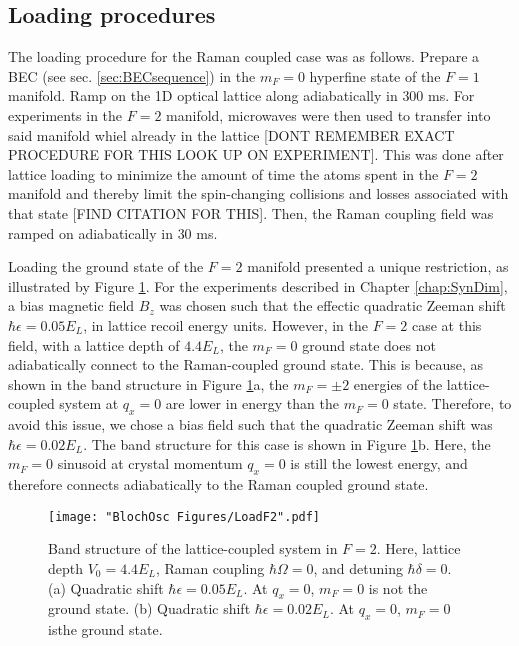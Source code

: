 \subsection{Loading procedures}
The loading procedure for the Raman coupled case was  as follows. Prepare a \Rb{} BEC (see sec. \ref{sec:BECsequence}) in the $m_F=0$ hyperfine state of the $F=1$ manifold. Ramp on the 1D optical lattice along \ex{} adiabatically in $300$ ms. For experiments in the $F=2$ manifold, microwaves were then used to transfer into said manifold whiel already in the lattice [DONT REMEMBER EXACT PROCEDURE FOR THIS LOOK UP ON EXPERIMENT]. This was done after lattice loading to minimize the amount of time the atoms spent in the $F=2$ manifold and thereby limit the spin-changing collisions and losses associated with that state [FIND CITATION FOR THIS].   Then, the Raman coupling field was ramped on adiabatically in $30$ ms.

Loading the ground state of the $F=2$ manifold presented a unique restriction, as illustrated by Figure \ref{fig:LoadF2}. For the experiments described in Chapter \ref{chap:SynDim}, a bias magnetic field $B_z$ was chosen such that the effectic quadratic Zeeman shift $\hbar\epsilon = 0.05 E_L$, in lattice recoil energy units. However, in the $F=2$ case at this field, with a lattice depth of $4.4 E_L$, the $m_F=0$ ground state does not adiabatically connect to the Raman-coupled ground state. This is because, as shown in the band structure in Figure \ref{fig:LoadF2}a, the $m_F=\pm2$ energies of the lattice-coupled system at $q_x=0$ are lower in energy than the $m_F=0$ state. Therefore, to avoid this issue, we chose a bias field such that the quadratic Zeeman shift was $\hbar\epsilon = 0.02 E_L$. The band structure for this case is shown in Figure \ref{fig:LoadF2}b. Here, the $m_F=0$ sinusoid at crystal momentum $q_x=0$ is still the lowest energy, and therefore connects adiabatically to the Raman coupled ground state. 
\begin{figure}
\texttt{[image: "BlochOsc Figures/LoadF2".pdf]}
\caption{Band structure of the lattice-coupled system in $F=2$. Here, lattice depth $V_0=4.4 E_L$, Raman coupling $\hbar\Omega=0$, and detuning $\hbar\delta=0$. (a) Quadratic shift $\hbar\epsilon=0.05 E_L$. At $q_x=0$, $m_F=0$ is not the ground state. (b) Quadratic shift $\hbar\epsilon = 0.02 E_L$.  At $q_x=0$, $m_F=0$ isthe ground state.}
\label{fig:LoadF2}
\end{figure}

